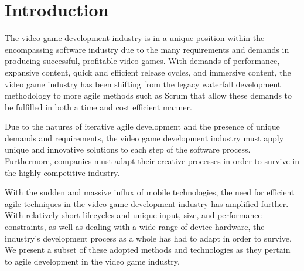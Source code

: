 \section{Introduction}
The video game development industry is in a unique position within the encompassing software industry due to the many requirements and demands in producing successful, profitable video games. With demands of performance, expansive content, quick and efficient release cycles, and immersive content, the video game industry has been shifting from the legacy waterfall development methodology to more agile methods such as Scrum that allow these demands to be fulfilled in both a time and cost efficient manner.

Due to the natures of iterative agile development and the presence of unique demands and requirements, the video game development industry must apply unique and innovative solutions to each step of the software process. Furthermore, companies must adapt their creative processes in order to survive in the highly competitive industry.

With the sudden and massive influx of mobile technologies, the need for efficient agile techniques in the video game development industry has amplified further. With relatively short lifecycles and unique input, size, and performance constraints, as well as dealing with a wide range of device hardware, the industry’s development process as a whole has had to adapt in order to survive. We present a subset of these adopted methods and technologies as they pertain to agile development in the video game industry.
